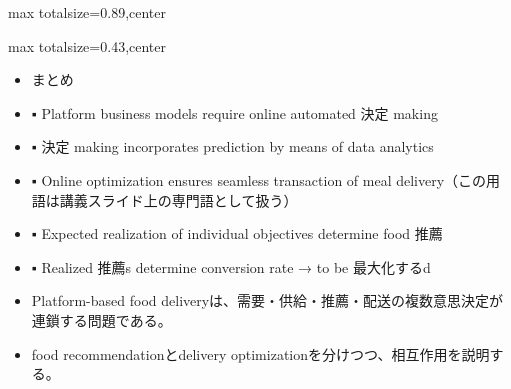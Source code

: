 \begin{minipage}[t]{0.58\textwidth}
\begin{adjustbox}{max totalsize={\textwidth}{0.89\textheight},center}
\begin{minipage}{\textwidth}
\end{minipage}
\end{adjustbox}
\end{minipage}


\clearpage
{}
\begin{minipage}[t]{0.405\textwidth}
\begin{adjustbox}{max totalsize={\textwidth}{0.43\textheight},center}
\begin{minipage}{\textwidth}\scriptsize
{}\begin{itemize}
\item まとめ
\item ▪ Platform business models require online automated 決定 making
\item ▪ 決定 making incorporates prediction by means of data analytics
\item ▪ Online optimization ensures seamless transaction of meal delivery（この用語は講義スライド上の専門語として扱う）
\item ▪ Expected realization of individual objectives determine food 推薦
\item ▪ Realized 推薦s determine conversion rate → to be 最大化するd
\end{itemize}\begin{itemize}
\item Platform-based food deliveryは、需要・供給・推薦・配送の複数意思決定が連鎖する問題である。
\item food recommendationとdelivery optimizationを分けつつ、相互作用を説明する。
\end{itemize}
\end{minipage}
\end{adjustbox}
\end{minipage}\hfill
